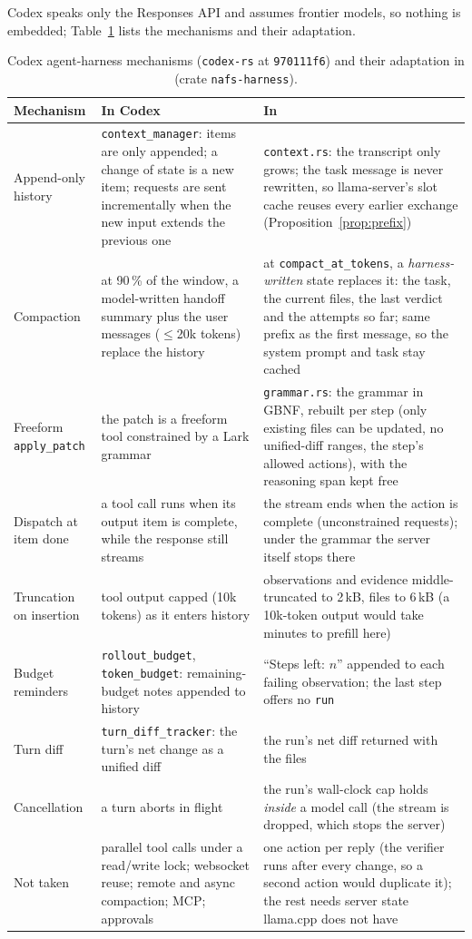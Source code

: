 Codex speaks only the Responses API and assumes frontier models, so nothing is
embedded; Table~\ref{tab:codexport} lists the mechanisms and their adaptation.

\begin{table}[t]
\centering
\caption{Codex agent-harness mechanisms (\texttt{codex-rs} at \texttt{970111f6}) and their adaptation in \Sys{} (crate \texttt{nafs-harness}).}
\label{tab:codexport}
\scriptsize
\begin{tabular}{@{}p{}p{}p{}@{}}
\toprule
Mechanism & In Codex & In \Sys{} \\
\midrule
Append-only history & \texttt{context\_manager}: items are only appended; a change of state is a new item; requests are sent incrementally when the new input extends the previous one & \texttt{context.rs}: the transcript only grows; the task message is never rewritten, so llama-server's slot cache reuses every earlier exchange (Proposition~\ref{prop:prefix}) \\
Compaction & at 90\,\% of the window, a model-written handoff summary plus the user messages ($\le$20k tokens) replace the history & at \texttt{compact\_at\_tokens}, a \emph{harness-written} state replaces it: the task, the current files, the last verdict and the attempts so far; same prefix as the first message, so the system prompt and task stay cached \\
Freeform \texttt{apply\_patch} & the patch is a freeform tool constrained by a Lark grammar & \texttt{grammar.rs}: the grammar in GBNF, rebuilt per step (only existing files can be updated, no unified-diff ranges, the step's allowed actions), with the reasoning span kept free \\
Dispatch at item done & a tool call runs when its output item is complete, while the response still streams & the stream ends when the action is complete (unconstrained requests); under the grammar the server itself stops there \\
Truncation on insertion & tool output capped (10k tokens) as it enters history & observations and evidence middle-truncated to 2\,kB, files to 6\,kB (a 10k-token output would take minutes to prefill here) \\
Budget reminders & \texttt{rollout\_budget}, \texttt{token\_budget}: remaining-budget notes appended to history & ``Steps left: $n$'' appended to each failing observation; the last step offers no \texttt{run} \\
Turn diff & \texttt{turn\_diff\_tracker}: the turn's net change as a unified diff & the run's net diff returned with the files \\
Cancellation & a turn aborts in flight & the run's wall-clock cap holds \emph{inside} a model call (the stream is dropped, which stops the server) \\
\midrule
Not taken & parallel tool calls under a read/write lock; websocket reuse; remote and async compaction; MCP; approvals & one action per reply (the verifier runs after every change, so a second action would duplicate it); the rest needs server state llama.cpp does not have \\
\bottomrule
\end{tabular}
\end{table}

